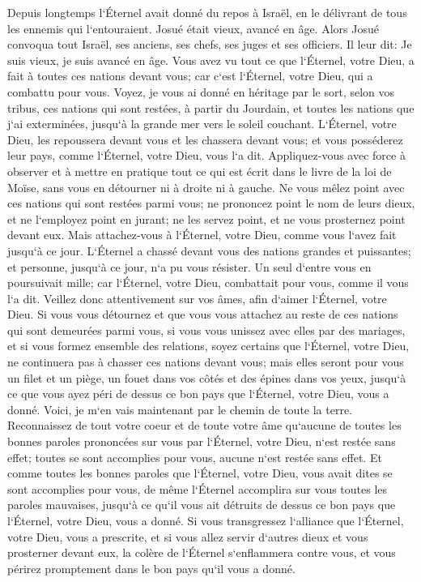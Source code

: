 \verse Depuis longtemps l`Éternel avait donné du repos à Israël, en le délivrant de tous les ennemis qui l`entouraient. Josué était vieux, avancé en âge. 
\verse Alors Josué convoqua tout Israël, ses anciens, ses chefs, ses juges et ses officiers. Il leur dit: Je suis vieux, je suis avancé en âge. 
\verse Vous avez vu tout ce que l`Éternel, votre Dieu, a fait à toutes ces nations devant vous; car c`est l`Éternel, votre Dieu, qui a combattu pour vous. 
\verse Voyez, je vous ai donné en héritage par le sort, selon vos tribus, ces nations qui sont restées, à partir du Jourdain, et toutes les nations que j`ai exterminées, jusqu`à la grande mer vers le soleil couchant. 
\verse L`Éternel, votre Dieu, les repoussera devant vous et les chassera devant vous; et vous posséderez leur pays, comme l`Éternel, votre Dieu, vous l`a dit. 
\verse Appliquez-vous avec force à observer et à mettre en pratique tout ce qui est écrit dans le livre de la loi de Moïse, sans vous en détourner ni à droite ni à gauche. 
\verse Ne vous mêlez point avec ces nations qui sont restées parmi vous; ne prononcez point le nom de leurs dieux, et ne l`employez point en jurant; ne les servez point, et ne vous prosternez point devant eux. 
\verse Mais attachez-vous à l`Éternel, votre Dieu, comme vous l`avez fait jusqu`à ce jour. 
\verse L`Éternel a chassé devant vous des nations grandes et puissantes; et personne, jusqu`à ce jour, n`a pu vous résister. 
\verse Un seul d`entre vous en poursuivait mille; car l`Éternel, votre Dieu, combattait pour vous, comme il vous l`a dit. 
\verse Veillez donc attentivement sur vos âmes, afin d`aimer l`Éternel, votre Dieu. 
\verse Si vous vous détournez et que vous vous attachez au reste de ces nations qui sont demeurées parmi vous, si vous vous unissez avec elles par des mariages, et si vous formez ensemble des relations, 
\verse soyez certains que l`Éternel, votre Dieu, ne continuera pas à chasser ces nations devant vous; mais elles seront pour vous un filet et un piège, un fouet dans vos côtés et des épines dans vos yeux, jusqu`à ce que vous ayez péri de dessus ce bon pays que l`Éternel, votre Dieu, vous a donné. 
\verse Voici, je m`en vais maintenant par le chemin de toute la terre. Reconnaissez de tout votre coeur et de toute votre âme qu`aucune de toutes les bonnes paroles prononcées sur vous par l`Éternel, votre Dieu, n`est restée sans effet; toutes se sont accomplies pour vous, aucune n`est restée sans effet. 
\verse Et comme toutes les bonnes paroles que l`Éternel, votre Dieu, vous avait dites se sont accomplies pour vous, de même l`Éternel accomplira sur vous toutes les paroles mauvaises, jusqu`à ce qu`il vous ait détruits de dessus ce bon pays que l`Éternel, votre Dieu, vous a donné. 
\verse Si vous transgressez l`alliance que l`Éternel, votre Dieu, vous a prescrite, et si vous allez servir d`autres dieux et vous prosterner devant eux, la colère de l`Éternel s`enflammera contre vous, et vous périrez promptement dans le bon pays qu`il vous a donné. 

